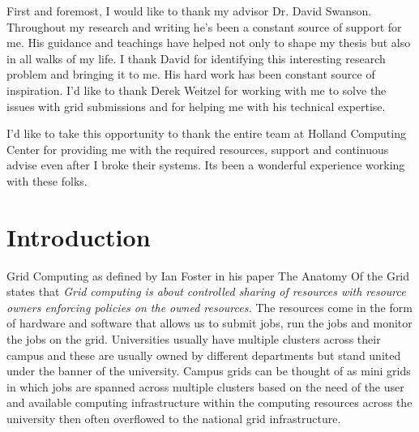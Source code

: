 \documentclass[ms,electronic,double]{nuthesis}
\begin{document}

\begin{acknowledgments}

First and foremost, I would like to thank my advisor Dr. David Swanson. Throughout my research
and writing he's been a constant source of support for me. His guidance and teachings have helped not 
only to shape my thesis but also in all walks of my life. I thank David for identifying this interesting
research problem and bringing it to me. His hard work has been constant source of inspiration.
 I'd like to thank Derek Weitzel for working with me to solve the 
 issues with grid submissions and for helping me with his technical expertise.
 
 I'd like to take this opportunity to thank the entire team at Holland 
Computing Center for providing me with the required resources, support and continuous advise
 even after I broke their systems. Its been a wonderful experience 
 working with these folks.
 
\end{acknowledgments}

\tableofcontents
\newpage
\listoffigures


\mainmatter

\chapter{Introduction}
Grid Computing as defined by Ian Foster in his paper The Anatomy Of the Grid \cite{Foster:2001:AGE:1080644.1080667}
states that 
\emph{Grid computing is about controlled sharing of resources with resource owners enforcing policies 
on the owned resources.} The resources come in the form of hardware 
and software that allows us to submit jobs, run the jobs and monitor the jobs on the grid. 
Universities usually have multiple clusters across their campus and these are 
usually owned by different departments but stand united under the banner of the university.
Campus grids can be thought of as mini grids in which jobs are spanned across multiple clusters
 based on the need of the user and available computing infrastructure within the computing resources across the university then often overflowed to the national
grid infrastructure\cite{derekThesis}.
\end{document}
